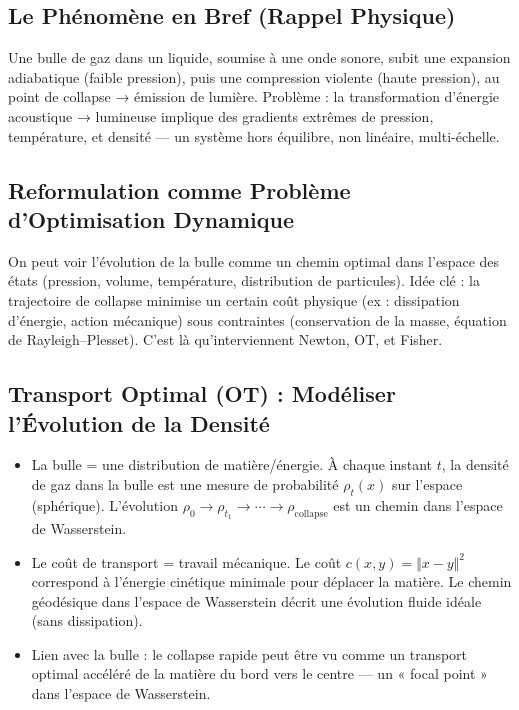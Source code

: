 \documentclass[a4paper,12pt]{article}
\begin{document}
\subsection{Le Phénomène en Bref (Rappel Physique)}
Une bulle de gaz dans un liquide, soumise à une onde sonore, subit une expansion adiabatique (faible pression), puis une compression violente (haute pression), au point de collapse → émission de lumière. Problème : la transformation d’énergie acoustique → lumineuse implique des gradients extrêmes de pression, température, et densité — un système hors équilibre, non linéaire, multi-échelle.
\subsection{Reformulation comme Problème d’Optimisation Dynamique}
On peut voir l’évolution de la bulle comme un chemin optimal dans l’espace des états (pression, volume, température, distribution de particules). Idée clé : la trajectoire de collapse minimise un certain coût physique (ex : dissipation d’énergie, action mécanique) sous contraintes (conservation de la masse, équation de Rayleigh–Plesset). C’est là qu’interviennent Newton, OT, et Fisher.
\subsection{Transport Optimal (OT) : Modéliser l’Évolution de la Densité}
\begin{itemize}
    \item La bulle = une distribution de matière/énergie. À chaque instant \( t \), la densité de gaz dans la bulle est une mesure de probabilité \( \rho_t(x) \) sur l’espace (sphérique). L’évolution \( \rho_0 \rightarrow \rho_{t_1} \rightarrow \cdots \rightarrow \rho_{\text{collapse}} \) est un chemin dans l’espace de Wasserstein.
    \item Le coût de transport = travail mécanique. Le coût \( c(x,y) = \Vert x - y \Vert^2 \) correspond à l’énergie cinétique minimale pour déplacer la matière. Le chemin géodésique dans l’espace de Wasserstein décrit une évolution fluide idéale (sans dissipation).
    \item Lien avec la bulle : le collapse rapide peut être vu comme un transport optimal accéléré de la matière du bord vers le centre — un « focal point » dans l’espace de Wasserstein.
\end{itemize}
\end{document}
